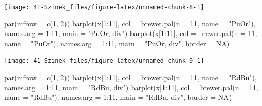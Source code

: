 \documentclass[
]{book}
\newenvironment{Shaded}{\begin{snugshade}}{\end{snugshade}}
\newcommand{\AttributeTok}[1]{\textcolor[rgb]{0.77,0.63,0.00}{#1}}
\newcommand{\ConstantTok}[1]{\textcolor[rgb]{0.00,0.00,0.00}{#1}}
\newcommand{\DecValTok}[1]{\textcolor[rgb]{0.00,0.00,0.81}{#1}}
\newcommand{\FunctionTok}[1]{\textcolor[rgb]{0.00,0.00,0.00}{#1}}
\newcommand{\NormalTok}[1]{#1}
\newcommand{\SpecialCharTok}[1]{\textcolor[rgb]{0.00,0.00,0.00}{#1}}
\newcommand{\StringTok}[1]{\textcolor[rgb]{0.31,0.60,0.02}{#1}}
\begin{document}
\begin{center}\texttt{[image: 41-Szinek\_files/figure-latex/unnamed-chunk-8-1]} \end{center}

\begin{Shaded}
\begin{Highlighting}[]
\FunctionTok{par}\NormalTok{(}\AttributeTok{mfrow =} \FunctionTok{c}\NormalTok{(}\DecValTok{1}\NormalTok{, }\DecValTok{2}\NormalTok{))}
\FunctionTok{barplot}\NormalTok{(x[}\DecValTok{1}\SpecialCharTok{:}\DecValTok{11}\NormalTok{], }\AttributeTok{col =} \FunctionTok{brewer.pal}\NormalTok{(}\AttributeTok{n =} \DecValTok{11}\NormalTok{, }\AttributeTok{name =} \StringTok{"PuOr"}\NormalTok{), }\AttributeTok{names.arg =} \DecValTok{1}\SpecialCharTok{:}\DecValTok{11}\NormalTok{, }
    \AttributeTok{main =} \StringTok{"PuOr, div"}\NormalTok{)}
\FunctionTok{barplot}\NormalTok{(x[}\DecValTok{1}\SpecialCharTok{:}\DecValTok{11}\NormalTok{], }\AttributeTok{col =} \FunctionTok{brewer.pal}\NormalTok{(}\AttributeTok{n =} \DecValTok{11}\NormalTok{, }\AttributeTok{name =} \StringTok{"PuOr"}\NormalTok{), }\AttributeTok{names.arg =} \DecValTok{1}\SpecialCharTok{:}\DecValTok{11}\NormalTok{, }
    \AttributeTok{main =} \StringTok{"PuOr, div"}\NormalTok{, }\AttributeTok{border =} \ConstantTok{NA}\NormalTok{)}
\end{Highlighting}
\end{Shaded}

\begin{center}\texttt{[image: 41-Szinek\_files/figure-latex/unnamed-chunk-9-1]} \end{center}

\begin{Shaded}
\begin{Highlighting}[]
\FunctionTok{par}\NormalTok{(}\AttributeTok{mfrow =} \FunctionTok{c}\NormalTok{(}\DecValTok{1}\NormalTok{, }\DecValTok{2}\NormalTok{))}
\FunctionTok{barplot}\NormalTok{(x[}\DecValTok{1}\SpecialCharTok{:}\DecValTok{11}\NormalTok{], }\AttributeTok{col =} \FunctionTok{brewer.pal}\NormalTok{(}\AttributeTok{n =} \DecValTok{11}\NormalTok{, }\AttributeTok{name =} \StringTok{"RdBu"}\NormalTok{), }\AttributeTok{names.arg =} \DecValTok{1}\SpecialCharTok{:}\DecValTok{11}\NormalTok{, }
    \AttributeTok{main =} \StringTok{"RdBu, div"}\NormalTok{)}
\FunctionTok{barplot}\NormalTok{(x[}\DecValTok{1}\SpecialCharTok{:}\DecValTok{11}\NormalTok{], }\AttributeTok{col =} \FunctionTok{brewer.pal}\NormalTok{(}\AttributeTok{n =} \DecValTok{11}\NormalTok{, }\AttributeTok{name =} \StringTok{"RdBu"}\NormalTok{), }\AttributeTok{names.arg =} \DecValTok{1}\SpecialCharTok{:}\DecValTok{11}\NormalTok{, }
    \AttributeTok{main =} \StringTok{"RdBu, div"}\NormalTok{, }\AttributeTok{border =} \ConstantTok{NA}\NormalTok{)}
\end{Highlighting}
\end{Shaded}
\end{document}
